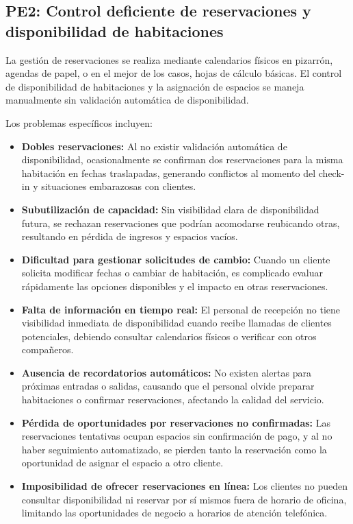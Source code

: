 \subsection{PE2: Control deficiente de reservaciones y disponibilidad de habitaciones}
\label{sec:pe2}

	La gestión de reservaciones se realiza mediante calendarios físicos en pizarrón, agendas de papel, o en el mejor de los casos, hojas de cálculo básicas. El control de disponibilidad de habitaciones y la asignación de espacios se maneja manualmente sin validación automática de disponibilidad.
	
	Los problemas específicos incluyen:
	
	\begin{itemize}
		\item \textbf{Dobles reservaciones:} Al no existir validación automática de disponibilidad, ocasionalmente se confirman dos reservaciones para la misma habitación en fechas traslapadas, generando conflictos al momento del check-in y situaciones embarazosas con clientes.
		
		\item \textbf{Subutilización de capacidad:} Sin visibilidad clara de disponibilidad futura, se rechazan reservaciones que podrían acomodarse reubicando otras, resultando en pérdida de ingresos y espacios vacíos.
		
		\item \textbf{Dificultad para gestionar solicitudes de cambio:} Cuando un cliente solicita modificar fechas o cambiar de habitación, es complicado evaluar rápidamente las opciones disponibles y el impacto en otras reservaciones.
		
		\item \textbf{Falta de información en tiempo real:} El personal de recepción no tiene visibilidad inmediata de disponibilidad cuando recibe llamadas de clientes potenciales, debiendo consultar calendarios físicos o verificar con otros compañeros.
		
		\item \textbf{Ausencia de recordatorios automáticos:} No existen alertas para próximas entradas o salidas, causando que el personal olvide preparar habitaciones o confirmar reservaciones, afectando la calidad del servicio.
		
		\item \textbf{Pérdida de oportunidades por reservaciones no confirmadas:} Las reservaciones tentativas ocupan espacios sin confirmación de pago, y al no haber seguimiento automatizado, se pierden tanto la reservación como la oportunidad de asignar el espacio a otro cliente.
		
		\item \textbf{Imposibilidad de ofrecer reservaciones en línea:} Los clientes no pueden consultar disponibilidad ni reservar por sí mismos fuera de horario de oficina, limitando las oportunidades de negocio a horarios de atención telefónica.
	\end{itemize}

